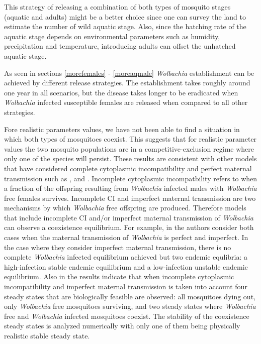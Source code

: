 \documentclass{ws-rv9x6}
\begin{document}
This strategy of releasing a combination of both types of mosquito stages (aquatic  and adults) might be a better choice since one can survey the land to estimate the number of wild aquatic stage. Also, since the hatching rate of the aquatic stage depends on environmental parameters such as humidity, precipitation and temperature, introducing adults can offset the unhatched aquatic stage. 

As seen in sections \ref{morefemales} - \ref{moreaqmale} \textit{Wolbachia} establishment can be achieved by different release strategies. The establishment takes roughly around one year in all scenarios, but the disease takes longer to be eradicated when \textit{Wolbachia} infected susceptible females are released when compared to all other strategies.

Fore realistic parameters values, we have not been able to find a situation in which both types of mosquitoes coexist. This suggests that for realistic parameter values the two mosquito populations are in a competitive-exclusion regime where only one of the species will persist. These results are consistent with other models that have considered complete cytoplasmic incompatibility and perfect maternal transmission such as \cite{hughes2013modelling}, \cite{koiller2014aedes} and \cite{qu2018modeling}. Incomplete cytoplasmic  incompatbility refers to when a fraction of the offspring resulting from \textit{Wolbachia} infected males with \textit{Wolbachia} free females survives. Incomplete CI and imperfect maternal transmission are two mechanisms by which \textit{Wolbachia} free offspring are produced. Therefore models that include incomplete CI and/or imperfect maternal transmission of \textit{Wolbachia} can observe a coexistence equilibrium.   For example, in \cite{qu2018modeling} the authors consider both cases when the maternal transmission of \textit{Wolbachia} is perfect and imperfect. In the case where they consider imperfect maternal transmission, there is no complete \textit{Wolbachia} infected equilibrium achieved but two endemic equlibria: a high-infection stable endemic equilibrium and a low-infection unstable endemic equilibrium.
Also in \cite{ndii2015modelling} the results indicate that when incomplete cytoplasmic incompatibility and imperfect maternal transmission is taken into account four steady
states that are biologically feasible are observed: all mosquitoes dying out, only \textit{Wolbachia} free
mosquitoes surviving, and two steady states where \textit{Wolbachia} free and \textit{Wolbachia} infected
mosquitoes coexist. The stability of the coexistence steady states is analyzed numerically with only one of them being physically realistic stable steady state.
\end{document}
